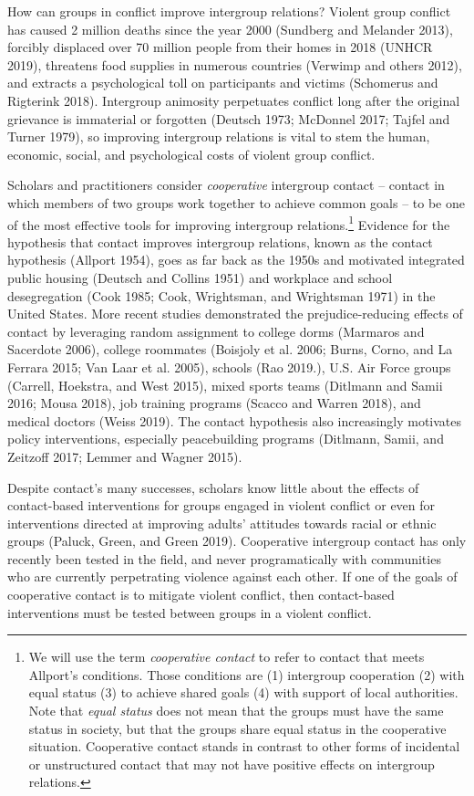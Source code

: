 \documentclass[11pt]{article}
\begin{document}
How can groups in conflict improve intergroup relations? Violent group
conflict has caused 2 million deaths since the year 2000 (Sundberg and
Melander 2013), forcibly displaced over 70 million people from their
homes in 2018 (UNHCR 2019), threatens food supplies in numerous
countries (Verwimp and others 2012), and extracts a psychological toll
on participants and victims (Schomerus and Rigterink 2018). Intergroup
animosity perpetuates conflict long after the original grievance is
immaterial or forgotten (Deutsch 1973; McDonnel 2017; Tajfel and Turner
1979), so improving intergroup relations is vital to stem the human,
economic, social, and psychological costs of violent group conflict.

Scholars and practitioners consider \emph{cooperative} intergroup
contact -- contact in which members of two groups work together to
achieve common goals -- to be one of the most effective tools for
improving intergroup relations.\footnote{We will use the term
  \emph{cooperative contact} to refer to contact that meets Allport's
  conditions. Those conditions are (1) intergroup cooperation (2) with
  equal status (3) to achieve shared goals (4) with support of local
  authorities. Note that \emph{equal status} does not mean that the
  groups must have the same status in society, but that the groups share
  equal status in the cooperative situation. Cooperative contact stands
  in contrast to other forms of incidental or unstructured contact that
  may not have positive effects on intergroup relations.} Evidence for
the hypothesis that contact improves intergroup relations, known as the
contact hypothesis (Allport 1954), goes as far back as the 1950s and
motivated integrated public housing (Deutsch and Collins 1951) and
workplace and school desegregation (Cook 1985; Cook, Wrightsman, and
Wrightsman 1971) in the United States. More recent studies demonstrated
the prejudice-reducing effects of contact by leveraging random
assignment to college dorms (Marmaros and Sacerdote 2006), college
roommates (Boisjoly et al. 2006; Burns, Corno, and La Ferrara 2015; Van
Laar et al. 2005), schools (Rao 2019.), U.S. Air Force groups (Carrell,
Hoekstra, and West 2015), mixed sports teams (Ditlmann and Samii 2016;
Mousa 2018), job training programs (Scacco and Warren 2018), and medical
doctors (Weiss 2019). The contact hypothesis also increasingly motivates
policy interventions, especially peacebuilding programs (Ditlmann,
Samii, and Zeitzoff 2017; Lemmer and Wagner 2015).

Despite contact's many successes, scholars know little about the effects
of contact-based interventions for groups engaged in violent conflict or
even for interventions directed at improving adults' attitudes towards
racial or ethnic groups (Paluck, Green, and Green 2019). Cooperative
intergroup contact has only recently been tested in the field, and never
programatically with communities who are currently perpetrating violence
against each other. If one of the goals of cooperative contact is to
mitigate violent conflict, then contact-based interventions must be
tested between groups in a violent conflict.
\end{document}
